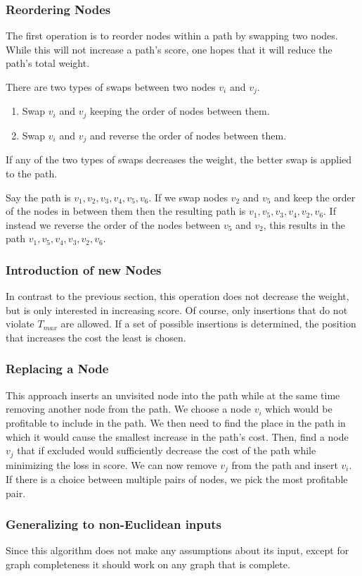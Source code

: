 \subsubsection{Reordering Nodes}
\label{subsubsec:03:reorder}

The first operation is to reorder nodes within a path by swapping two nodes.
While this will not increase a path's score, one hopes that it will reduce the path's total weight.

There are two types of swaps between two nodes $v_i$ and $v_j$.
\begin{enumerate}
	\itemsep0em
	\item Swap $v_i$ and $v_j$ keeping the order of nodes between them.
	\item Swap $v_i$ and $v_j$ and reverse the order of nodes between them.
\end{enumerate}
If any of the two types of swaps decreases the weight, the better swap is applied to the path.

Say the path is $v_1, v_2, v_3, v_4, v_5, v_6$.
If we swap nodes $v_2$ and $v_5$ and keep the order of the nodes in between them 
then the resulting path is $v_1, v_5, v_3, v_4, v_2, v_6$.
If instead we reverse the order of the nodes between $v_5$ and $v_2$, this results in the path $v_1, v_5, v_4, v_3, v_2, v_6$.

\subsubsection{Introduction of new Nodes}

In contrast to the previous section, this operation does not decrease the weight, but is only interested in increasing score.
Of course, only insertions that do not violate $T_{max}$ are allowed.
If a set of possible insertions is determined, the position that increases the cost the least is chosen.

\subsubsection{Replacing a Node}

This approach inserts an unvisited node into the path while at the same time removing another node from the path.
We choose a node $v_i$ which would be profitable to include in the path.
We then need to find the place in the path in which it would cause the smallest increase in the path's cost.
Then, find a node $v_j$ that if excluded would sufficiently decrease the cost of the path while minimizing the loss in score.
We can now remove $v_j$ from the path and insert $v_i$.
If there is a choice between multiple pairs of nodes, we pick the most profitable pair.

\subsubsection{Generalizing to non-Euclidean inputs}

Since this algorithm does not make any assumptions about its input, except for graph completeness it should work on any graph that is complete.

